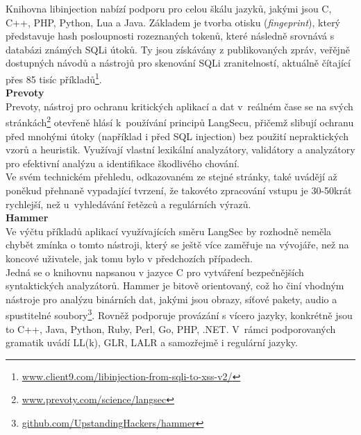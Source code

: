 Knihovna libinjection nabízí podporu pro celou škálu jazyků, jakými jsou C, C++, PHP, Python, Lua a Java. Základem je tvorba otisku (\textit{fingeprint}),
který představuje hash posloupnosti rozeznaných tokenů, které následně srovnává s databázi známých SQLi útoků. Ty jsou získávány z publikovaných zpráv,
veřějně dostupných návodů a nástrojů pro skenování SQLi zranitelností, aktuálně čítající přes 85 tisíc 
příkladů\footnote{\url{www.client9.com/libinjection-from-sqli-to-xss-v2/}}. \\

\Bat{} \textbf{Prevoty} \\
Prevoty, nástroj pro ochranu kritických aplikací a dat v~reálném čase se na svých stránkách\footnote{\url{www.prevoty.com/science/langsec}} otevřeně 
hlásí k~používání principů LangSecu, přičemž slibují ochranu před mnohými útoky (například i před SQL injection) bez použití nepraktických vzorů 
a heuristik. Využívají vlastní lexikální analyzátory, validátory a analyzátory pro efektivní analýzu a identifikace škodlivého chování. \\

Ve svém technickém přehledu, odkazovaném ze stejné stránky, také uvádějí až poněkud přehnaně vypadající tvrzení, že takovéto zpracování vstupu 
je 30-50krát rychlejší, než u~vyhledávání řetězců a regulárních výrazů. \\

\Bat{} \textbf{Hammer} \\
Ve výčtu příkladů aplikací využívajících směru LangSec by rozhodně neměla chybět zmínka o tomto nástroji, který se ještě více zaměřuje na vývojáře,
než na koncové uživatele, jak tomu bylo v předchozích případech. \\

Jedná se o knihovnu napsanou v jazyce C pro vytváření bezpečnějších syntaktických analyzátorů. Hammer je bitově orientovaný, což ho činí vhodným nástroje
pro analýzu binárních dat, jakými jsou obrazy, síťové pakety, audio a spustitelné soubory\footnote{\url{github.com/UpstandingHackers/hammer}}.
Rovněž podporuje provázání s vícero jazyky, konkrétně jsou to C++, Java, Python, Ruby, Perl, Go, PHP, .NET. V~rámci podporovaných gramatik uvádí LL(k), 
GLR, LALR a samozřejmě i regulární jazyky.\\

